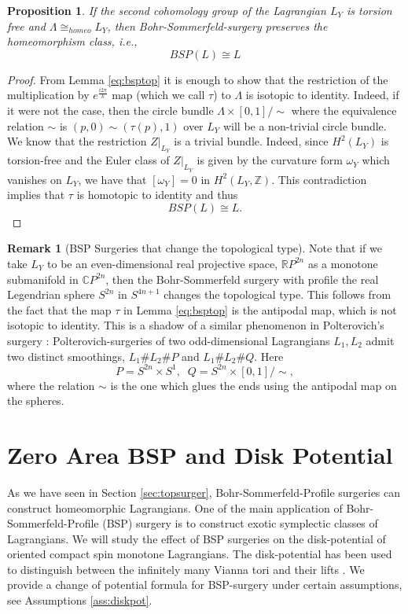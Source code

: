 \documentclass[11pt, oneside,dvipsnames]{amsart}
\newcommand{\<}{\langle}
\renewcommand{\>}{\rangle}
\newcommand{\bC}{\mathbb{C}}
\newcommand{\bR}{\mathbb{R}}
\newcommand{\bZ}{\mathbb{Z}}
\newtheorem{prop}[Theorem]{Proposition}
\theoremstyle{definition}
\theoremstyle{definition}
\newtheorem{remark}[Theorem]{Remark}
\numberwithin{equation}{subsection}
\begin{document}
\begin{prop}
    If the second cohomology group of the Lagrangian $L_Y$ is torsion free and  $\Lambda \cong_{homeo} L_Y$, then Bohr-Sommerfeld-surgery  preserves the homeomorphism class, i.e.,
    $$BSP(L) \cong L$$
\end{prop}
\begin{proof}
    From  Lemma \ref{eq:bsptop} it is enough to show that the restriction of the multiplication by $e^{\frac{i2\pi}{k}}$ map (which we call $\tau$) to $\Lambda$ is isotopic to identity. Indeed, if it were not the case, then the circle bundle $\Lambda \times [0,1] / \sim $ where the equivalence relation $\sim$ is  $(p,0) \sim (\tau(p),1)$ over $L_Y$ will be a non-trivial circle bundle.  We know that the restriction $Z|_{L_Y}$ is a trivial bundle. Indeed, since $H^2(L_Y)$ is torsion-free and the Euler class of $Z|_{L_Y}$ is given by the curvature form $\omega_Y$ which vanishes on $L_Y$, we have that $[\omega_Y]= 0 $ in $H^2(L_Y,\bZ)$. This contradiction implies that $\tau$ is homotopic to identity and thus $$BSP(L) \cong L.$$
\end{proof}

\begin{remark}[BSP Surgeries that change the topological type]
    Note that if we take $L_Y$ to be an even-dimensional real projective space, $\bR P^{2n}$ as a monotone submanifold in $\bC P^{2n}$, then the Bohr-Sommerfeld surgery with profile the real Legendrian sphere $S^{2n}$ in $S^{4n+1}$ changes the topological type. This follows from the fact that the map $\tau$ in Lemma \ref{eq:bsptop} is the antipodal map, which is not isotopic to identity. This is a shadow of a similar phenomenon in Polterovich's surgery : Polterovich-surgeries of two odd-dimensional Lagrangians $L_1, L_2$ admit two distinct smoothings, $L_1 \# L_2 \# P$ and $L_1 \# L_2 \#  Q$. Here $$P= S^{2n} \times S^1, \; \; Q = S^{2n} \times [0,1]/\sim,$$ where the relation $\sim$ is the one which glues the ends using the antipodal map on the spheres. 
    
\end{remark}
\section{Zero Area BSP and Disk Potential} \label{sec:zero-dp}

As we have seen in Section \ref{sec:topsurger}, Bohr-Sommerfeld-Profile surgeries can construct homeomorphic Lagrangians. One of the main application of Bohr-Sommerfeld-Profile (BSP) surgery is to construct exotic symplectic classes of Lagrangians. We will study the effect of BSP surgeries on the disk-potential of oriented compact spin monotone Lagrangians. The disk-potential has been used to distinguish between the infinitely many Vianna tori \cite{Via16,Via17} and their lifts \cite{chw,DTVW}. We provide a change of potential formula for BSP-surgery under certain assumptions, see Assumptions \ref{ass:diskpot}. 
\end{document}

